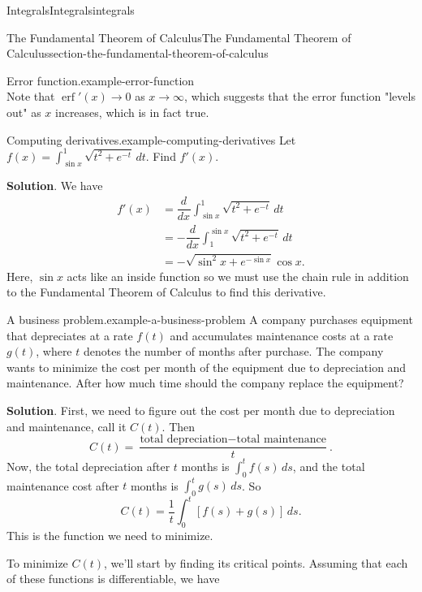 \documentclass[oneside,10pt,]{book}
\numberwithin{equation}{section}
\newcommand{\dv}[3][]{\dfrac{d^{#1} #2}{d #3^{#1}}}
\newcommand{\erf}[1]{\operatorname{erf} #1}
\begin{document}
\begin{chapterptx}{Integrals}{}{Integrals}{}{}{integrals}
\begin{sectionptx}{The Fundamental Theorem of Calculus}{}{The Fundamental Theorem of Calculus}{}{}{section-the-fundamental-theorem-of-calculus}
\begin{example}{Error function.}{example-error-function}
\begin{equation*}
\end{equation*}
Note that \(\erf'(x)\to0\) as \(x\to\infty\), which suggests that the error function "levels out" as \(x\) increases, which is in fact true.%
\end{example}
\begin{example}{Computing derivatives.}{example-computing-derivatives}%
\hypertarget{p-471}{}%
Let \(f(x) = \int_{\sin x}^{1}\sqrt{t^{2} + e^{-t}}\,dt.\) Find \(f'(x)\).%
\par\smallskip%
\noindent\textbf{Solution}.\hypertarget{solution-103}{}\quad%
\hypertarget{p-472}{}%
We have%
\begin{align*}
f'(x) & = \dv{}{x}\int_{\sin x}^{1}\sqrt{t^{2} + e^{-t}}\,dt \\
& = -\dv{}{x}\int_{1}^{\sin x}\sqrt{t^{2} + e^{-t}}\,dt \\
& = -\sqrt{\sin^{2}x+e^{-\sin x}}\cos x. 
\end{align*}
Here, \(\sin x\) acts like an inside function so we must use the chain rule in addition to the Fundamental Theorem of Calculus to find this derivative.%
\end{example}
\begin{example}{A business problem.}{example-a-business-problem}%
\hypertarget{p-473}{}%
A company purchases equipment that depreciates at a rate \(f(t)\) and accumulates maintenance costs at a rate \(g(t)\), where \(t\) denotes the number of months after purchase. The company wants to minimize the cost per month of the equipment due to depreciation and maintenance. After how much time should the company replace the equipment?%
\par\smallskip%
\noindent\textbf{Solution}.\hypertarget{solution-104}{}\quad%
\hypertarget{p-474}{}%
First, we need to figure out the cost per month due to depreciation and maintenance, call it \(C(t)\). Then%
\begin{equation*}
C(t) = \frac{\text{total depreciation} - \text{total maintenance}}{t}.
\end{equation*}
Now, the total depreciation after \(t\) months is \(\int_{0}^{t}f(s)\,ds\), and the total maintenance cost after \(t\) months is \(\int_{0}^{t}g(s)\,ds\). So%
\begin{equation*}
C(t) = \frac{1}{t}\int_{0}^{t}[f(s) + g(s)]\,ds.
\end{equation*}
This is the function we need to minimize.%
\par
\hypertarget{p-475}{}%
To minimize \(C(t)\), we'll start by finding its critical points. Assuming that each of these functions is differentiable, we have%

\end{example}
\end{sectionptx}
\end{chapterptx}
\end{document}
